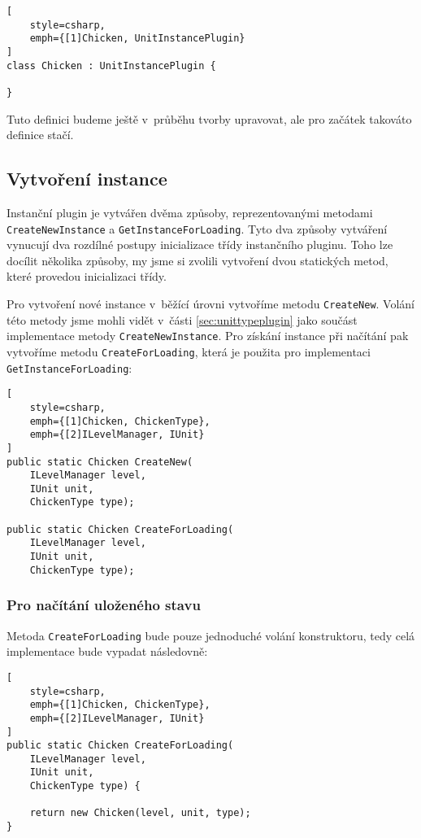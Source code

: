 \begin{lstlisting}[
	style=csharp,
	emph={[1]Chicken, UnitInstancePlugin}
]
class Chicken : UnitInstancePlugin {

}
\end{lstlisting}

Tuto definici budeme ještě v~průběhu tvorby upravovat, ale pro začátek takováto definice stačí.


\subsection{Vytvoření instance}

Instanční plugin je vytvářen dvěma způsoby, reprezentovanými metodami \texttt{CreateNewInstance} a \texttt{GetInstanceForLoading}. Tyto dva způsoby vytváření vynucují dva rozdílné postupy inicializace třídy instančního pluginu. Toho lze docílit několika způsoby, my jsme si zvolili vytvoření dvou statických metod, které provedou inicializaci třídy.

Pro vytvoření nové instance v~běžící úrovni vytvoříme metodu \texttt{CreateNew}. Volání této metody jsme mohli vidět v~části \ref{sec:unittypeplugin} jako součást implementace metody \texttt{CreateNewInstance}. Pro získání instance při načítání pak vytvoříme metodu \texttt{CreateForLoading}, která je použita pro implementaci \texttt{GetInstanceForLoading}:

\begin{lstlisting}[
	style=csharp,
	emph={[1]Chicken, ChickenType},
	emph={[2]ILevelManager, IUnit}
]
public static Chicken CreateNew(
	ILevelManager level, 
	IUnit unit, 
	ChickenType type);

public static Chicken CreateForLoading(
	ILevelManager level, 
	IUnit unit, 
	ChickenType type);
\end{lstlisting}


\subsubsection{Pro načítání uloženého stavu}

Metoda \texttt{CreateForLoading} bude pouze jednoduché volání konstruktoru, tedy celá implementace bude vypadat následovně:

\begin{lstlisting}[
	style=csharp,
	emph={[1]Chicken, ChickenType},
	emph={[2]ILevelManager, IUnit}
]
public static Chicken CreateForLoading(
	ILevelManager level, 
	IUnit unit, 
	ChickenType type) {
	
	return new Chicken(level, unit, type);
}
\end{lstlisting}

